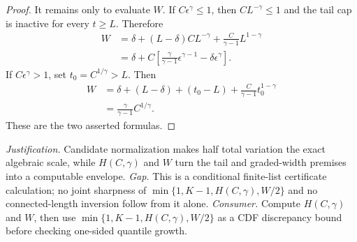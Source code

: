 \documentclass{article}
\begin{document}
\begin{proof}
It remains only to evaluate \(W\). If \(C\epsilon^\gamma\le1\), then \(CL^{-\gamma}\le1\) and the tail cap is inactive for every \(t\ge L\). Therefore
\[
\begin{aligned}
W
&=\delta+(L-\delta)CL^{-\gamma}
  +\frac{C}{\gamma-1}L^{1-\gamma}\\
&=\delta+C\left[
 \frac{\gamma}{\gamma-1}\epsilon^{\gamma-1}
 -\delta\epsilon^\gamma\right].
\end{aligned}
\]
If \(C\epsilon^\gamma>1\), set \(t_0=C^{1/\gamma}>L\). Then
\[
\begin{aligned}
W
&=\delta+(L-\delta)+(t_0-L)
  +\frac{C}{\gamma-1}t_0^{1-\gamma}\\
&=\frac{\gamma}{\gamma-1}C^{1/\gamma}.
\end{aligned}
\]
These are the two asserted formulas.
\end{proof}
\par\smallskip\noindent \textit{Justification.} Candidate normalization makes half total variation the exact algebraic scale, while \(H(C,\gamma)\) and \(W\) turn the tail and graded-width premises into a computable envelope. \textit{Gap.} This is a conditional finite-list certificate calculation; no joint sharpness of \(\min\{1,K-1,H(C,\gamma),W/2\}\) and no connected-length inversion follow from it alone. \textit{Consumer.} Compute \(H(C,\gamma)\) and \(W\), then use \(\min\{1,K-1,H(C,\gamma),W/2\}\) as a CDF discrepancy bound before checking one-sided quantile growth.
\end{document}
